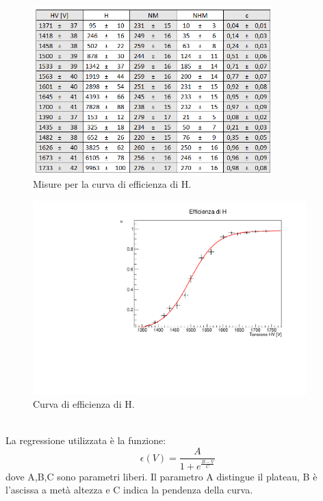 \documentclass[11pt]{article} %
\begin{document}
\begin{figure}[h!]
\begin{center}
\includegraphics[width=350px]{img/table_H.png}
\caption{Misure per la curva di efficienza di H.}
\label{fig:table_H}
\end{center}
\end{figure}
\begin{figure}[!ht]
\begin{center}
\includegraphics[width=400px]{img/chart_H.pdf}
\caption{Curva di efficienza di H.}
\label{fig:chart_H}
\end{center}
\end{figure}
\\La regressione utilizzata è la funzione:
\begin{equation}
\epsilon \left( V \right) =\frac{A}{1+e^{\frac{B-V}{C}}}
\end{equation}
dove A,B,C sono parametri liberi. Il parametro A distingue il plateau, B è l'ascissa a metà altezza e C indica la pendenza della curva.\\
\end{document}

